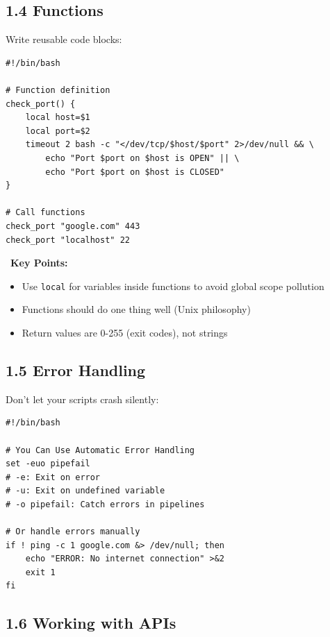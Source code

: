 \documentclass[12pt]{article}
\newcommand{\tipsicon}{\faLightbulb}
\begin{document}
\subsection*{1.4 Functions}

Write reusable code blocks:

\begin{highlightbox}
\begin{verbatim}
#!/bin/bash

# Function definition
check_port() {
    local host=$1
    local port=$2
    timeout 2 bash -c "</dev/tcp/$host/$port" 2>/dev/null && \
        echo "Port $port on $host is OPEN" || \
        echo "Port $port on $host is CLOSED"
}

# Call functions
check_port "google.com" 443
check_port "localhost" 22
\end{verbatim}
\end{highlightbox}

\begin{infobox}
\tipsicon\ \textbf{Key Points:}
\begin{itemize}
    \item Use \texttt{local} for variables inside functions to avoid global scope pollution
    \item Functions should do one thing well (Unix philosophy)
    \item Return values are 0-255 (exit codes), not strings
\end{itemize}
\end{infobox}

\subsection*{1.5 Error Handling}

Don't let your scripts crash silently:

\begin{highlightbox}
\begin{verbatim}
#!/bin/bash

# You Can Use Automatic Error Handling
set -euo pipefail
# -e: Exit on error
# -u: Exit on undefined variable
# -o pipefail: Catch errors in pipelines

# Or handle errors manually
if ! ping -c 1 google.com &> /dev/null; then
    echo "ERROR: No internet connection" >&2
    exit 1
fi
\end{verbatim}
\end{highlightbox}

\subsection*{1.6 Working with APIs}
\end{document}
